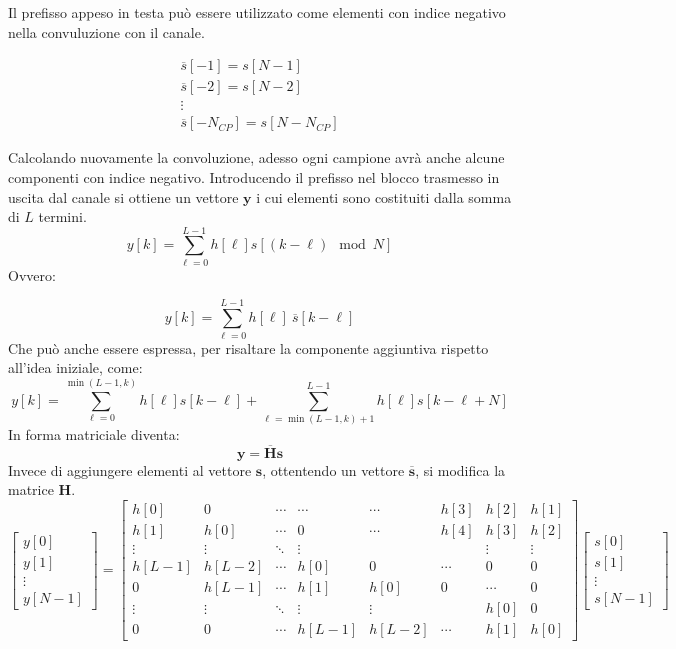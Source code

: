 Il prefisso appeso in testa può essere utilizzato come elementi con indice negativo nella convuluzione con il canale.



\[
    \begin{array}{ll}
        \overline{s}[-1] = s[N - 1] \\
        \overline{s}[-2] = s[N - 2] \\
        \vdots \\
        \overline{s}[-N_{CP}] = s[N - N_{CP}]
    \end{array}
\]



Calcolando nuovamente la convoluzione, adesso ogni campione avrà anche alcune componenti con indice negativo.
Introducendo il prefisso nel blocco trasmesso in uscita dal canale si ottiene un vettore $\mathbf{y}$ i cui elementi sono costituiti dalla somma di $L$ termini.
\[
y[k] = \sum_{\ell=0}^{L-1} h[\ell] s[(k-\ell) \mod N]
\]
Ovvero:

\[
    y[k] = \sum_{\ell=0}^{L-1} h[\ell] \ \overline{s}[k-\ell]
\]
Che può anche essere espressa, per risaltare la componente aggiuntiva rispetto all'idea iniziale, come:
\[
y[k] = \sum_{\ell=0}^{\min(L-1, k)} h[\ell] s[k-\ell] + \sum_{\ell=\min(L-1, k)+1}^{L-1} h[\ell] s[k-\ell + N]
\]
In forma matriciale diventa:
\[
    \mathbf{y} = \mathbf{\overline{H}} \mathbf{s}
\]
Invece di aggiungere elementi al vettore $\mathbf{s}$, ottentendo un vettore $\mathbf{\overline{s}}$, si modifica la matrice $\mathbf{H}$.
\[ 
\begin{bmatrix} y[0] \\ y[1] \\ \vdots \\ y[N-1] \end{bmatrix} 
= 
\begin{bmatrix}
    h[0] & 0 & \cdots & \cdots & \cdots & h[3] & h[2] & h[1] \\
    h[1] & h[0] & \cdots & 0 & \cdots & h[4] & h[3] & h[2] \\
    \vdots & \vdots & \ddots & \vdots & &  & \vdots & \vdots \\
    h[L-1] & h[L-2] & \cdots & h[0] & 0 & \cdots & 0 & 0 \\
    0 & h[L-1] & \cdots & h[1] & h[0] & 0 & \cdots & 0 \\
    \vdots & \vdots & \ddots & \vdots & \vdots & & h[0] & 0 \\
    0 & 0 & \cdots & h[L-1] & h[L-2] & \cdots & h[1] & h[0]
\end{bmatrix}   
\begin{bmatrix} s[0] \\ s[1] \\ \vdots \\ s[N-1] \end{bmatrix}
\]



